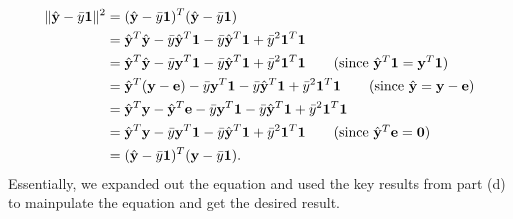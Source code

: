 \documentclass[10pt]{article}
\begin{document}
\begin{itemize}
    \begin{align*}
        \| \hat{\mathbf{y}} - \bar{y}\mathbf{1} \|^2 &= (\hat{\mathbf{y}} - \bar{y}\mathbf{1})^T(\hat{\mathbf{y}} - \bar{y}\mathbf{1}) \\
        &= \hat{\mathbf{y}}^T \hat{\mathbf{y}} - \bar{y}\hat{\mathbf{y}}^T\mathbf{1} - \bar{y}\hat{\mathbf{y}}^T\mathbf{1} + \bar{y}^2 \mathbf{1}^T\mathbf{1} \\
        &= \hat{\mathbf{y}}^T \hat{\mathbf{y}} - \bar{y}\mathbf{y}^T\mathbf{1} - \bar{y}\hat{\mathbf{y}}^T\mathbf{1} + \bar{y}^2 \mathbf{1}^T\mathbf{1} \tag{since \(\hat{\mathbf{y}}^T\mathbf{1} = \mathbf{y}^T\mathbf{1}\)}\\
        &= \hat{\mathbf{y}}^T (\mathbf{y} - \mathbf{e}) - \bar{y}\mathbf{y}^T\mathbf{1} - \bar{y}\hat{\mathbf{y}}^T\mathbf{1} + \bar{y}^2 \mathbf{1}^T\mathbf{1} \tag{since \(\hat{\mathbf{y}} = \mathbf{y} - \mathbf{e}\)}\\
        &= \hat{\mathbf{y}}^T\mathbf{y} - \hat{\mathbf{y}}^T\mathbf{e} - \bar{y}\mathbf{y}^T\mathbf{1} - \bar{y}\hat{\mathbf{y}}^T\mathbf{1} + \bar{y}^2 \mathbf{1}^T\mathbf{1} \\
        &= \hat{\mathbf{y}}^T\mathbf{y} - \bar{y}\mathbf{y}^T\mathbf{1} - \bar{y}\hat{\mathbf{y}}^T\mathbf{1} + \bar{y}^2 \mathbf{1}^T\mathbf{1} \tag{since \(\hat{\mathbf{y}}^T\mathbf{e} = \mathbf{0}\)} \\
        &= (\hat{\mathbf{y}} - \bar{y}\mathbf{1})^T(\mathbf{y} - \bar{y}\mathbf{1}).
    \end{align*}
    Essentially, we expanded out the equation and used the key results from part (d) to mainpulate the equation and get the desired result. 
\end{itemize}

\end{document}
